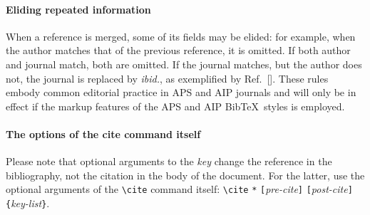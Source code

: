 \documentclass[%
 reprint,
 amsmath,amssymb,
 aps,
]{revtex4-1}
\begin{document}
\paragraph{Eliding repeated information}
When a reference is merged, some of its fields may be elided: for example,
when the author matches that of the previous reference, it is omitted.
If both author and journal match, both are omitted.
If the journal matches, but the author does not, the journal is replaced by \emph{ibid.},
as exemplified by Ref.~[].
These rules embody common editorial practice in APS and AIP journals and will only
be in effect if the markup features of the APS and AIP Bib\TeX\ styles is employed.

\paragraph{The options of the cite command itself}
Please note that optional arguments to the \emph{key} change the reference in the bibliography,
not the citation in the body of the document.
For the latter, use the optional arguments of the \verb+\cite+ command itself:
\verb+\cite+ \texttt{*}\allowbreak
\texttt{[}\emph{pre-cite}\texttt{]}\allowbreak
\texttt{[}\emph{post-cite}\texttt{]}\allowbreak
\verb+{+\emph{key-list}\verb+}+.
\end{document}
